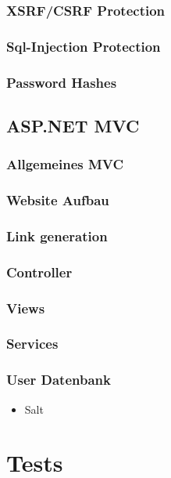 \documentclass[11pt]{scrartcl}
\begin{document}
\subsubsection{XSRF/CSRF Protection}
\label{sec:xss}
\subsubsection{Sql-Injection Protection}
\label{sec:sqli}
\subsubsection{Password Hashes}
\label{sec:hash}
\subsection{ASP.NET MVC}
\label{sec:MVC}
\subsubsection{Allgemeines MVC}
\label{sec:allgemein}

\subsubsection{Website Aufbau}
\label{sec:aufbau}
\subsubsection{Link generation}
\label{sec:link}
\subsubsection{Controller}
\label{sec:Controller}
\subsubsection{Views}
\label{sec:Views}
\subsubsection{Services}
\label{sec:Services}
\subsubsection{User Datenbank}
\label{sec:UserDB}
\begin{itemize}
	\item Salt
\end{itemize}
\label{sec:salt}

\section{Tests}
\label{sec:Tests}
\end{document}
